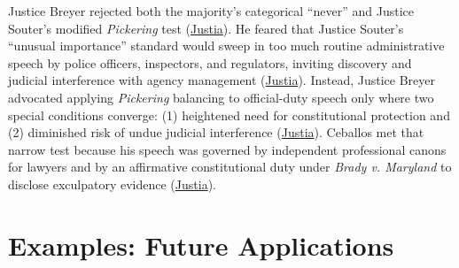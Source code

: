 \documentclass[12pt]{article}
\begin{document}
Justice Breyer rejected both the majority's categorical ``never'' and Justice Souter's modified \textit{Pickering} test (\href{https://supreme.justia.com/cases/federal/us/547/410/}{Justia}). He feared that Justice Souter's ``unusual importance'' standard would sweep in too much routine administrative speech by police officers, inspectors, and regulators, inviting discovery and judicial interference with agency management (\href{https://supreme.justia.com/cases/federal/us/547/410/}{Justia}). Instead, Justice Breyer advocated applying \textit{Pickering} balancing to official-duty speech only where two special conditions converge: (1) heightened need for constitutional protection and (2) diminished risk of undue judicial interference (\href{https://supreme.justia.com/cases/federal/us/547/410/}{Justia}). Ceballos met that narrow test because his speech was governed by independent professional canons for lawyers and by an affirmative constitutional duty under \textit{Brady v. Maryland} to disclose exculpatory evidence (\href{https://supreme.justia.com/cases/federal/us/547/410/}{Justia}).

\section{Examples: Future Applications}
\end{document}
